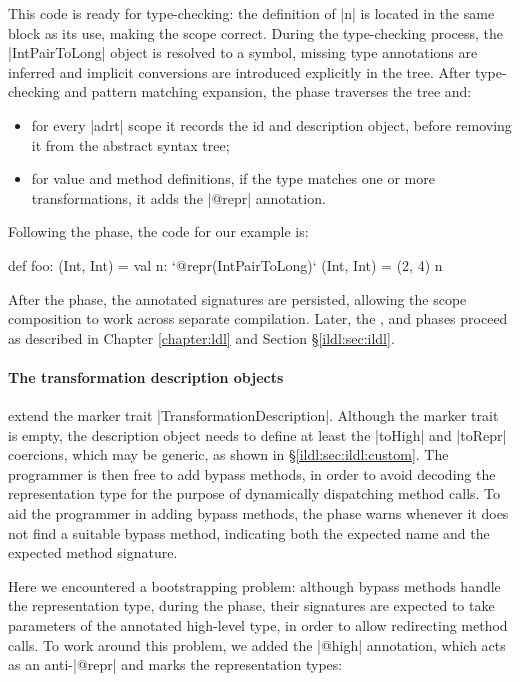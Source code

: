 This code is ready for type-checking: the definition of |n| is located in the same block as its use, making the scope correct. During the type-checking process, the |IntPairToLong| object is resolved to a symbol, missing type annotations are inferred and implicit conversions are introduced explicitly in the tree. After type-checking and pattern matching expansion, the \inject{} phase traverses the tree and:


\begin{itemize}
\item for every |adrt| scope it records the id and description object, before removing it from the abstract syntax tree;
\item for value and method definitions, if the type matches one or more transformations, it adds the |@repr| annotation.
\end{itemize}


\noindent Following the \inject{} phase, the code for our example is:

\begin{lstlisting-nobreak}
def foo: (Int, Int) = {
  val n: `@repr(IntPairToLong)` (Int, Int) = (2, 4)
  n
}
\end{lstlisting-nobreak}

\noindent
After the \inject{} phase, the annotated signatures are persisted, allowing the scope composition to work across separate compilation.
Later, the \bridge{}, \coerce{} and \commit{} phases proceed as described in Chapter \ref{chapter:ldl} and Section \S\ref{ildl:sec:ildl}.

\paragraph*{The transformation description objects} extend the marker trait |TransformationDescription|. Although the marker trait is empty, the description object needs to define at least the |toHigh| and |toRepr| coercions, which may be generic, as shown in \S\ref{ildl:sec:ildl:custom}. The programmer is then free to add bypass methods, in order to avoid decoding the representation type for the purpose of dynamically dispatching method calls. To aid the programmer in adding bypass methods, the \coerce{} phase warns whenever it does not find a suitable bypass method, indicating both the expected name and the expected method signature.

Here we encountered a bootstrapping problem: although bypass methods handle the representation type, during the \coerce{} phase, their signatures are expected to take parameters of the annotated high-level type, in order to allow redirecting method calls. To work around this problem, we added the |@high| annotation, which acts as an anti-|@repr| and marks the representation types:

